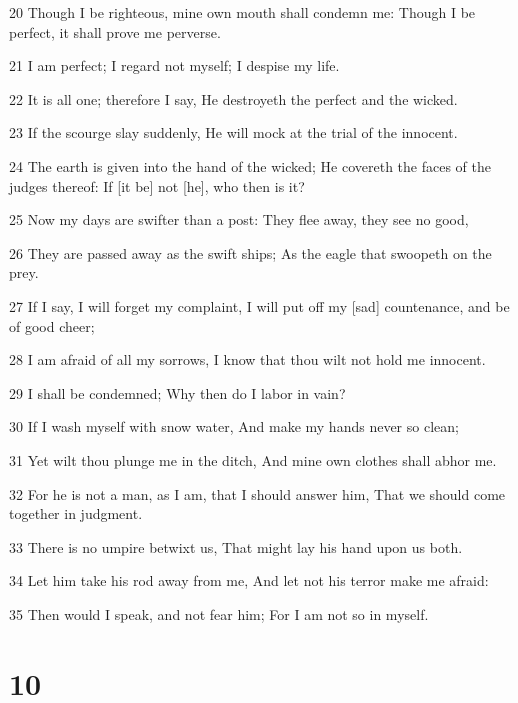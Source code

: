 \par 20 Though I be righteous, mine own mouth shall condemn me: Though I be perfect, it shall prove me perverse.
\par 21 I am perfect; I regard not myself; I despise my life.
\par 22 It is all one; therefore I say, He destroyeth the perfect and the wicked.
\par 23 If the scourge slay suddenly, He will mock at the trial of the innocent.
\par 24 The earth is given into the hand of the wicked; He covereth the faces of the judges thereof: If [it be] not [he], who then is it?
\par 25 Now my days are swifter than a post: They flee away, they see no good,
\par 26 They are passed away as the swift ships; As the eagle that swoopeth on the prey.
\par 27 If I say, I will forget my complaint, I will put off my [sad] countenance, and be of good cheer;
\par 28 I am afraid of all my sorrows, I know that thou wilt not hold me innocent.
\par 29 I shall be condemned; Why then do I labor in vain?
\par 30 If I wash myself with snow water, And make my hands never so clean;
\par 31 Yet wilt thou plunge me in the ditch, And mine own clothes shall abhor me.
\par 32 For he is not a man, as I am, that I should answer him, That we should come together in judgment.
\par 33 There is no umpire betwixt us, That might lay his hand upon us both.
\par 34 Let him take his rod away from me, And let not his terror make me afraid:
\par 35 Then would I speak, and not fear him; For I am not so in myself.

\chapter{10}

